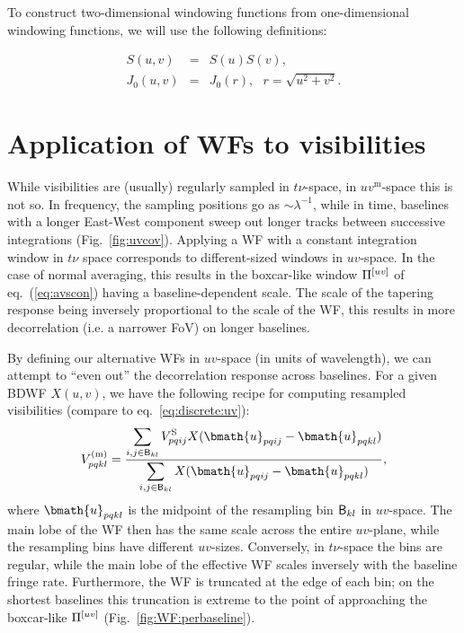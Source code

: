 \documentclass[useAMS,usenatbib]{mn2e}
\newcommand{\OMS}[1]{\textcolor{red}{{\bf OMS: #1}}}
\begin{document}
To construct two-dimensional  windowing functions from one-dimensional windowing functions, we will use the following definitions:


\begin{eqnarray}
S(u,v) &=& S(u)S(v), \nonumber\\
J_0(u,v) &=& J_0(r), ~~~r=\sqrt{u^2+v^2}.\nonumber
\end{eqnarray}

\section{Application of WFs to visibilities}

While visibilities are (usually) regularly sampled in $t\nu$-space, in $uv^\mathrm{m}$-space this is not so. In frequency, 
the sampling positions go as $\sim\lambda^{-1}$, while in time, baselines with a longer East-West component sweep out longer tracks between successive 
integrations (Fig.~\ref{fig:uvcov}). Applying a WF with a constant integration window in $t\nu$ space corresponds to 
different-sized windows in $uv$-space. In the case of normal averaging, this results in the boxcar-like window $\Pi^{[uv]}$ of 
eq.~(\ref{eq:avscon}) having a baseline-dependent scale. The scale of the tapering response being inversely proportional to 
the scale of the WF, this results in more decorrelation (i.e. a narrower FoV) on longer baselines.

By defining our alternative WFs in $uv$-space (in units of wavelength), we can attempt to ``even out'' the decorrelation 
response across baselines. For a given BDWF $X(u,v)$, we have the following recipe 
for computing resampled visibilities (compare to eq.~\ref{eq:discrete:uv}):
\begin{equation}
\label{eq:avg:wf}
V^\mathrm{(m)}_{pqkl} = \frac{\displaystyle\sum\limits_{{i,j}\in \Bij_{kl}} \Vs_{pqij} X(\bmath{u}_{pqij}-\bmath{u}_{pqkl})}
{\displaystyle\sum\limits_{{i,j}\in \Bij_{kl}} X(\bmath{u}_{pqij}-\bmath{u}_{pqkl})},
\end{equation}
where $\bmath{u}_{pqkl}$ is the midpoint of the resampling bin $\mathsf{B}_{kl}$ in $uv$-space. The main lobe of the WF then 
has the same scale across the entire $uv$-plane, while the resampling bins have different $uv$-sizes. Conversely, in 
$t\nu$-space the bins
are regular, while the main lobe of the effective WF scales inversely with the baseline fringe rate. Furthermore, 
the WF is truncated at the edge of each bin; on the shortest baselines this truncation is extreme to the 
point of approaching the boxcar-like $\Pi^{[uv]}$ (Fig.~\ref{fig:WF:perbaseline}).
\end{document}
